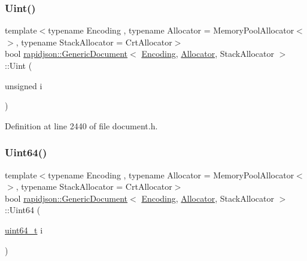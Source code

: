 \subsubsection{\texorpdfstring{Uint()}{Uint()}}
{\footnotesize\ttfamily template$<$typename Encoding , typename Allocator  = Memory\+Pool\+Allocator$<$$>$, typename Stack\+Allocator  = Crt\+Allocator$>$ \\
bool \mbox{\hyperlink{classrapidjson_1_1_generic_document}{rapidjson\+::\+Generic\+Document}}$<$ \mbox{\hyperlink{classrapidjson_1_1_encoding}{Encoding}}, \mbox{\hyperlink{classrapidjson_1_1_allocator}{Allocator}}, Stack\+Allocator $>$\+::Uint (\begin{DoxyParamCaption}\item[{unsigned}]{i }\end{DoxyParamCaption})}



Definition at line 2440 of file document.\+h.


\begin{DoxyCode}{0}

\end{DoxyCode}
\mbox{\label{classrapidjson_1_1_generic_document_a3b56cdb811eea58932dcb1e425263831}} 
\subsubsection{\texorpdfstring{Uint64()}{Uint64()}}
{\footnotesize\ttfamily template$<$typename Encoding , typename Allocator  = Memory\+Pool\+Allocator$<$$>$, typename Stack\+Allocator  = Crt\+Allocator$>$ \\
bool \mbox{\hyperlink{classrapidjson_1_1_generic_document}{rapidjson\+::\+Generic\+Document}}$<$ \mbox{\hyperlink{classrapidjson_1_1_encoding}{Encoding}}, \mbox{\hyperlink{classrapidjson_1_1_allocator}{Allocator}}, Stack\+Allocator $>$\+::Uint64 (\begin{DoxyParamCaption}\item[{\mbox{\hyperlink{stdint_8h_aec6fcb673ff035718c238c8c9d544c47}{uint64\+\_\+t}}}]{i }\end{DoxyParamCaption})}



